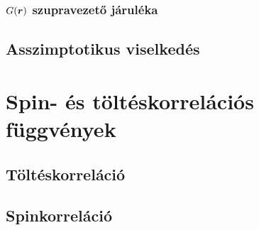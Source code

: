 \documentclass[a4paper,12pt,titlepage]{article}
\newcommand{\RR}{{\vb*{r}}}
\begin{document}
\subsubsection{$G(\RR)$ szupravezető járuléka}

\subsection{Asszimptotikus viselkedés}



\section{Spin- és töltéskorrelációs függvények}

\subsection{Töltéskorreláció}
\subsection{Spinkorreláció}




\begin{thebibliography}{}
\end{thebibliography}
\end{document}
